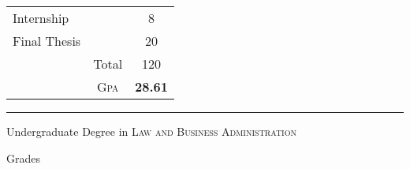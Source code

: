 \documentclass[a4paper,10pt]{article}
\begin{document}
\begin{center}
\begin{tabular}{lcc}
		Internship                                      &                & 8                   \\

		Final Thesis                                    &                & 20                  \\

		                                                & Total          & 120                 \\\cline{2-3}
		                                                & \textsc{Gpa}   & \textbf{28.61}
	\end{tabular}
\end{center}
\bigskip
\hrule
\bigskip
\par{\centering\Large \hypertarget{grds_cleli}{Undergraduate Degree in \textsc{Law and Business Administration}}\par}\large{\centering Grades\par}\normalsize
\end{document}
